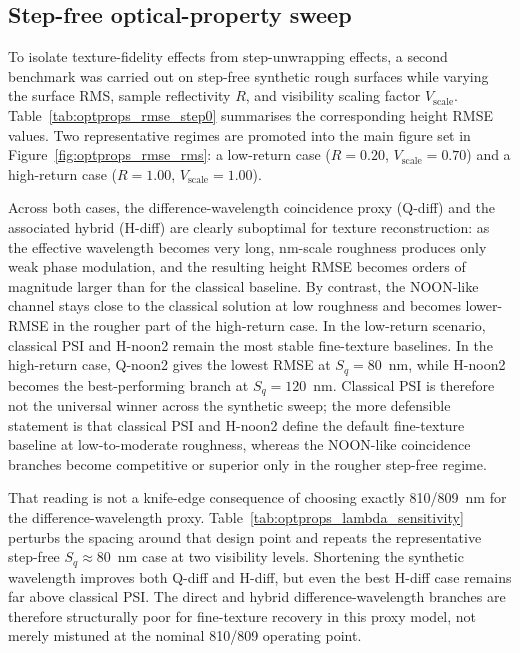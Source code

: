 \documentclass[photonics,article,submit,pdftex,moreauthors]{Definitions/mdpi}
\begin{document}


\subsection{Step-free optical-property sweep}
To isolate texture-fidelity effects from step-unwrapping effects, a second benchmark was carried out on step-free synthetic rough surfaces while varying the surface RMS, sample reflectivity $R$, and visibility scaling factor $V_\mathrm{scale}$. Table~\ref{tab:optprops_rmse_step0} summarises the corresponding height RMSE values. Two representative regimes are promoted into the main figure set in Figure~\ref{fig:optprops_rmse_rms}: a low-return case ($R=0.20$, $V_\mathrm{scale}=0.70$) and a high-return case ($R=1.00$, $V_\mathrm{scale}=1.00$).

Across both cases, the difference-wavelength coincidence proxy (Q-diff) and the associated hybrid (H-diff) are clearly suboptimal for texture reconstruction: as the effective wavelength becomes very long, nm-scale roughness produces only weak phase modulation, and the resulting height RMSE becomes orders of magnitude larger than for the classical baseline. By contrast, the NOON-like channel stays close to the classical solution at low roughness and becomes lower-RMSE in the rougher part of the high-return case. In the low-return scenario, classical PSI and H-noon2 remain the most stable fine-texture baselines. In the high-return case, Q-noon2 gives the lowest RMSE at $S_q=80$~nm, while H-noon2 becomes the best-performing branch at $S_q=120$~nm. Classical PSI is therefore not the universal winner across the synthetic sweep; the more defensible statement is that classical PSI and H-noon2 define the default fine-texture baseline at low-to-moderate roughness, whereas the NOON-like coincidence branches become competitive or superior only in the rougher step-free regime.

That reading is not a knife-edge consequence of choosing exactly 810/809~nm for the difference-wavelength proxy. Table~\ref{tab:optprops_lambda_sensitivity} perturbs the spacing around that design point and repeats the representative step-free $S_q\approx 80$~nm case at two visibility levels. Shortening the synthetic wavelength improves both Q-diff and H-diff, but even the best H-diff case remains far above classical PSI. The direct and hybrid difference-wavelength branches are therefore structurally poor for fine-texture recovery in this proxy model, not merely mistuned at the nominal 810/809 operating point.
\end{document}
